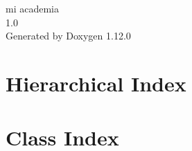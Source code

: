 \documentclass[twoside]{book}
\newcommand{\+}{\discretionary{\mbox{\scriptsize$\hookleftarrow$}}{}{}}
\newcommand{\clearemptydoublepage}{%
    \newpage{\pagestyle{empty}\cleardoublepage}%
  }
\begin{document}
  \raggedbottom
    \hypersetup{pageanchor=false,
                bookmarksnumbered=true,
                pdfencoding=unicode
               }
  \begin{titlepage}
  \vspace*{7cm}
  \begin{center}%
  {\Large mi academia}\\
  [1ex]\large 1.\+0 \\
  \vspace*{1cm}
  {\large Generated by Doxygen 1.12.0}\\
  \end{center}
  \end{titlepage}
  \clearemptydoublepage
  \tableofcontents
  \clearemptydoublepage
  \hypersetup{pageanchor=true}
\chapter{Hierarchical Index}

\chapter{Class Index}

\end{document}
